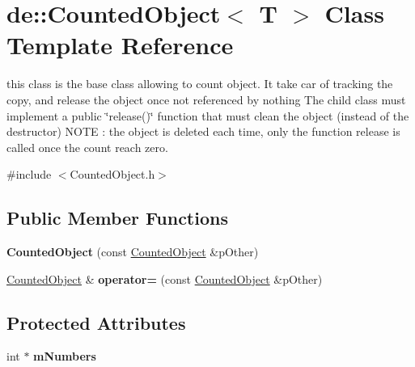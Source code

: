 \hypertarget{classde_1_1_counted_object}{
\section{de\-:\-:\-Counted\-Object$<$ \-T $>$ \-Class \-Template \-Reference}
\label{classde_1_1_counted_object}
}


this class is the base class allowing to count object. \-It take car of tracking the copy, and release the object once not referenced by nothing \-The child class must implement a public \char`\"{}release()\char`\"{} function that must clean the object (instead of the destructor) \-N\-O\-T\-E \-: the object is deleted each time, only the function release is called once the count reach zero.  




{\ttfamily \#include $<$\-Counted\-Object.\-h$>$}

\subsection*{\-Public \-Member \-Functions}
\begin{DoxyCompactItemize}
\item 
\hypertarget{classde_1_1_counted_object_a6f5d16c74555894b096f354625b4d903}{
{\bfseries \-Counted\-Object} (const \hyperlink{classde_1_1_counted_object}{\-Counted\-Object} \&p\-Other)}
\label{classde_1_1_counted_object_a6f5d16c74555894b096f354625b4d903}

\item 
\hypertarget{classde_1_1_counted_object_a0fd6acfd589acd511c81934f025980c9}{
\hyperlink{classde_1_1_counted_object}{\-Counted\-Object} \& {\bfseries operator=} (const \hyperlink{classde_1_1_counted_object}{\-Counted\-Object} \&p\-Other)}
\label{classde_1_1_counted_object_a0fd6acfd589acd511c81934f025980c9}

\end{DoxyCompactItemize}
\subsection*{\-Protected \-Attributes}
\begin{DoxyCompactItemize}
\item 
\hypertarget{classde_1_1_counted_object_acb48eadb2bf07a7eb0d5e1d8eff795c8}{
int $\ast$ {\bfseries m\-Numbers}}
\label{classde_1_1_counted_object_acb48eadb2bf07a7eb0d5e1d8eff795c8}

\end{DoxyCompactItemize}


